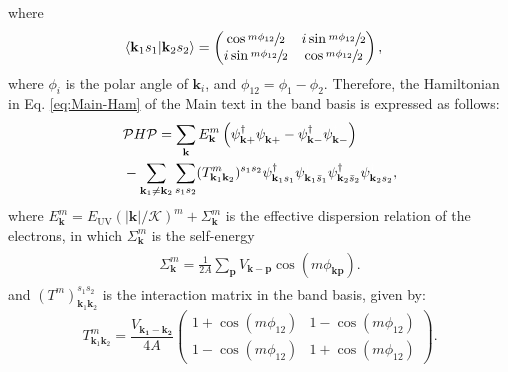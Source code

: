 \documentclass[english,aps,prd,nofootinbib,twocolumn]{revtex4-1}
\begin{document}
where
\begin{equation}
\begin{split}
& \left\langle \mathbf{k}_{1}s_{1} | \mathbf{k}_{2}s_{2} \right\rangle =
\begin{pmatrix}
     \cos\sfrac{m\phi_{12}}{2}  &    i\sin\sfrac{m\phi_{12}}{2} \\  
    i\sin\sfrac{m\phi_{12}}{2}  &     \cos\sfrac{m\phi_{12}}{2}
\end{pmatrix},
\end{split}
\end{equation}
where $\phi_i$ is the polar angle of $\mathbf{k}_i$, and  $\phi_{12}=\phi_1-\phi_2$. Therefore, the Hamiltonian in Eq. \eqref{eq:Main-Ham} of the Main text in the band basis is expressed as follows:
\begin{equation}
\begin{split}
&\mathcal{P} H \mathcal{P} = 
\sum_{\mathbf{k }}E^{m}_{\mathbf{k}}
\left( 
\psi_{\mathbf{k}+ }^{\textcolor{black}{\dagger}}
\psi_{\mathbf{k}+ }^{\textcolor{white}{\dagger}} - 
\psi_{\mathbf{k}- }^{\textcolor{black}{\dagger}}
\psi_{\mathbf{k}- }^{\textcolor{white}{\dagger}}
\right)
\\
&- 
\sum_{\mathbf{k}_{1}\neq \mathbf{k}_{2}} 
\sum_{s_{1} s_{2}} 
(T^{m}_{\mathbf{k}_{1}\mathbf{k}_{2}})^{s_{1}s_{2}}
\psi_{\mathbf{k}_{1}s_{1} }^{\textcolor{black}{\dagger}}
\psi_{\mathbf{k}_{1}\bar{s}_{1} }^{\textcolor{white}{\dagger}}
\psi_{\mathbf{k}_{2}\bar{s}_{2} }^{\textcolor{black}{\dagger}}
\psi_{\mathbf{k}_{2}s_{2} }^{\textcolor{white}{\dagger}}
,
\end{split}
\end{equation}
where $E^{m}_{\mathbf{k}}=E_{\mathrm{UV} }(|\mathbf{k}|/\mathcal{K})^{m}+\Sigma^{m}_{\mathbf{k}}$ is the effective dispersion relation of the electrons, in which $\Sigma^{m}_{\mathbf{k}}$ is the self-energy
\begin{eqnarray}
\label{eq:Supp:Self-Energy-expression}
\begin{split}
\Sigma^{m}_{\mathbf{k }} = 
\frac{1}{2A}\sum_{\mathbf{p}}V_{\mathbf{k-p}}\cos(m\phi_{\mathbf{kp}}).
\end{split}
\end{eqnarray}
and $(T^{m})_{\mathbf{k}_{1}\mathbf{k}_{2}}^{s_{1}s_{2}}$ is the interaction matrix in the band basis, given by:
\begin{equation}
\label{eq:Supp:Interaction-matrix-band-basis}
T^{m}_{\mathbf{k}_{1}\mathbf{k}_{2}} \! = \!
\frac{V_{\mathbf{k_{1}-k_{2}}}}{4A} 
\begin{pmatrix}
    1+\cos(m\phi_{12})  &    1-\cos(m\phi_{12}) \\  
    1-\cos(m\phi_{12})  &    1+\cos(m\phi_{12})
\end{pmatrix}.
\end{equation}
\end{document}
